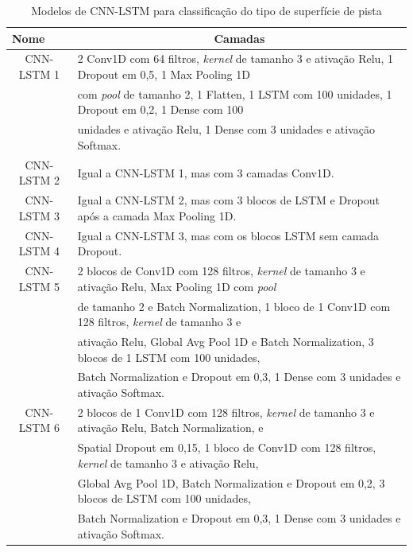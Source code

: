 \begin{table}[h!]
\scriptsize
\centering
\caption{Modelos de CNN-LSTM para classificação do tipo de superfície de pista} 
\label{table:cnn_lstm_superficie_pista_1}
\begin{tabular}{cl}
\toprule 
\multicolumn{1}{l}{\textbf{Nome}} & 
\multicolumn{1}{c}{\textbf{Camadas}} \\ \midrule
CNN-LSTM 1 &  2 Conv1D com 64 filtros, \textit{kernel} de tamanho 3 e ativação Relu, 1 Dropout em 0,5, 1 Max Pooling 1D \\ & com \textit{pool} de tamanho 2, 1 Flatten, 1 LSTM com 100 unidades, 1 Dropout em 0,2, 1 Dense com 100 \\ & unidades e ativação Relu, 1 Dense com 3 unidades e ativação Softmax. \\ \midrule
CNN-LSTM 2 & Igual a CNN-LSTM 1, mas com 3 camadas Conv1D. \\ \midrule
CNN-LSTM 3 & Igual a CNN-LSTM 2, mas com 3 blocos de LSTM e Dropout após a camada Max Pooling 1D. \\ \midrule
CNN-LSTM 4 & Igual a CNN-LSTM 3, mas com os blocos LSTM sem camada Dropout. \\ \midrule
CNN-LSTM 5 &  2 blocos de Conv1D com 128 filtros, \textit{kernel} de tamanho 3 e ativação Relu, Max Pooling 1D com \textit{pool} \\ & de tamanho 2 e Batch Normalization, 1 bloco de 1 Conv1D com 128 filtros, \textit{kernel} de tamanho 3 e \\ & ativação  Relu,  Global Avg Pool 1D e Batch Normalization, 3 blocos de 1 LSTM com 100 unidades, \\ & Batch  Normalization e Dropout em 0,3, 1 Dense com 3 unidades e ativação Softmax. \\ \midrule
CNN-LSTM 6 & 2 blocos de 1 Conv1D com 128 filtros, \textit{kernel} de tamanho 3 e ativação Relu, Batch Normalization, e \\ & Spatial   Dropout em 0,15, 1 bloco de Conv1D com 128 filtros, \textit{kernel} de tamanho 3 e ativação Relu, \\ & Global Avg Pool  1D, Batch Normalization e Dropout em 0,2, 3 blocos de LSTM com 100 unidades, \\ & Batch Normalization e  Dropout em 0,3, 1 Dense com 3 unidades e ativação Softmax. \\ \bottomrule
\end{tabular}
\end{table}

